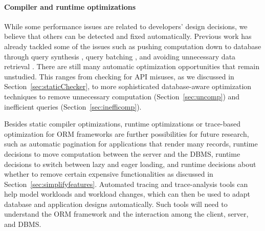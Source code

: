 
\vspace{-0.12in} 
\paragraph{\bf{Compiler and runtime optimizations}}
While some performance issues are related to developers' design decisions, we believe that others can be detected and fixed automatically. Previous work has already tackled 
some of the issues such as pushing computation down to database through query synthesis \cite{cheung:pldi13}, query batching \cite{cheung:sigmod14:sloth, dbridge:tkde15}, and avoiding
unnecessary data retrieval \cite{chen:se16:redundantData}. There are still many 
automatic optimization opportunities that remain unstudied. This ranges from checking for API misuses, as we discussed in Section~\ref{sec:staticChecker}, to more sophisticated 
database-aware optimization techniques to remove unnecessary computation (Section~\ref{sec:uncomp}) and inefficient queries (Section~\ref{sec:inefficomp}). 

Besides static compiler optimizations, runtime optimizations or trace-based optimization for ORM frameworks are further possibilities for future research, such as automatic pagination
for applications that render many records,
runtime decisions to move computation between the server and the DBMS, 
runtime decisions to switch between lazy and eager loading,
and 
runtime decisions about whether to %
remove certain expensive functionalities as discussed in Section~\ref{sec:simplifyfeatures}.
Automated tracing and trace-analysis tools can help model workloads
and workload changes, which can then be used to adapt database and application designs automatically.
Such tools will need to understand the ORM framework and the interaction among the client, server, and DBMS.
\vspace{-0.13in} 
